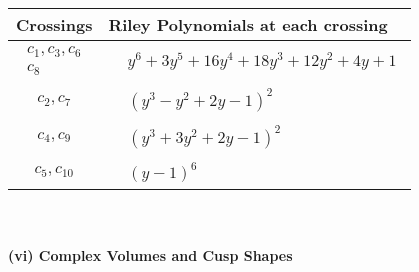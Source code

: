 \documentclass[1p]{elsarticle_modified}
\theoremstyle{definition}
\begin{document}
\begin{tabular}{m{50pt}|m{274pt}}
Crossings & \hspace{64pt}Riley Polynomials at each crossing \\
\hline $$\begin{aligned}c_{1},c_{3},c_{6}\\c_{8}\end{aligned}$$&$\begin{aligned}
&y^6+3 y^5+16 y^4+18 y^3+12 y^2+4 y+1
\end{aligned}$\\
\hline $$\begin{aligned}c_{2},c_{7}\end{aligned}$$&$\begin{aligned}
&(y^3- y^2+2 y-1)^2
\end{aligned}$\\
\hline $$\begin{aligned}c_{4},c_{9}\end{aligned}$$&$\begin{aligned}
&(y^3+3 y^2+2 y-1)^2
\end{aligned}$\\
\hline $$\begin{aligned}c_{5},c_{10}\end{aligned}$$&$\begin{aligned}
&(y-1)^6
\end{aligned}$\\
\hline
\end{tabular}\\~\\
\newpage\flushleft \textbf{(vi) Complex Volumes and Cusp Shapes}
\end{document}
